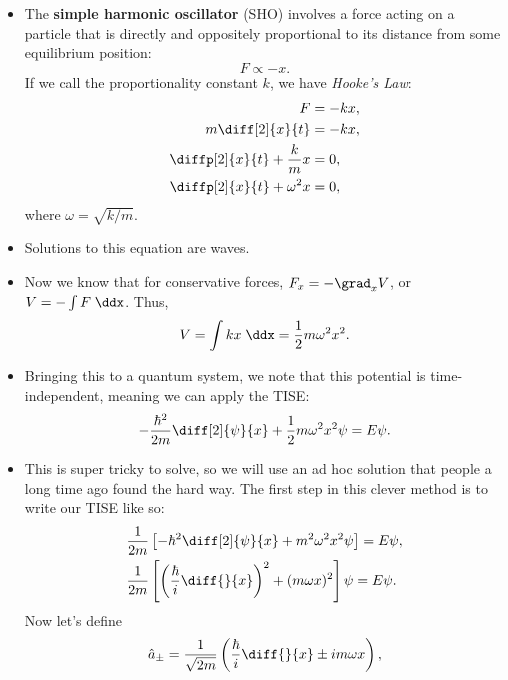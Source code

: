 \begin{itemize}
    \item The \textbf{simple harmonic oscillator} (SHO) involves a force acting on a particle that is directly and oppositely proportional to its distance from some equilibrium position:
        \begin{equation*}
            F \propto -x.
        \end{equation*}
        If we call the proportionality constant $k$, we have \textit{Hooke's Law}:
        \begin{align*}
            F &= -kx, \\
            m\diff[2]{x}{t} &= -kx, \\
            \diffp[2]{x}{t} + \frac{k}{m}x &= 0, \\
            \diffp[2]{x}{t} + \omega^2x &= 0,
        \end{align*}
        where $\omega = \sqrt{k/m}$.
    \item Solutions to this equation are waves.
    \item Now we know that for conservative forces, $F_x = -\grad_x V$, or $V = -\int F\;\ddx$. Thus,
        \begin{equation*}
            V = \int kx\;\ddx = \frac{1}{2}m\omega^2x^2.
        \end{equation*}
    \item Bringing this to a quantum system, we note that this potential is time-independent, meaning we can apply the TISE:
        \begin{equation*}
            -\frac{\hbar^2}{2m}\diff[2]{\psi}{x} + \frac{1}{2}m\omega^2x^2 \psi = E\psi.
        \end{equation*}
    \item This is super tricky to solve, so we will use an ad hoc solution that people a long time ago found the hard way. The first step in this clever method is to write our TISE like so:
        \begin{align*}
            &\frac{1}{2m} \left[ -\hbar^2 \diff[2]{\psi}{x} + m^2\omega^2x^2 \psi \right] = E\psi, \\
            &\frac{1}{2m} \left[ \left( \frac{\hbar}{i}\diff{}{x} \right)^2 + (m\omega x)^2 \right] \psi = E\psi.
        \end{align*}
        Now let's define 
        \begin{equation}
            \hat{a}_{\pm} = \frac{1}{\sqrt{2m}} \left( \frac{\hbar}{i} \diff{}{x} \pm im\omega x \right),
        \end{equation}

\end{itemize}
